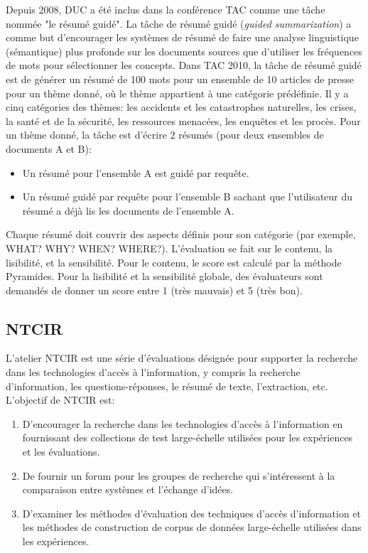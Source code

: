 \documentclass[a4paper,12pt,oneside]{../use/ESIthesis}
\begin{document}
Depuis 2008, DUC a été inclus dans la conférence TAC comme une tâche nommée "le résumé guidé". 
La tâche de résumé guidé (\textit{guided summarization}) a comme but d'encourager les systèmes de résumé de faire une analyse linguistique (sémantique) plus profonde sur les documents sources que d'utiliser les fréquences de mots pour sélectionner les concepts. 
Dans TAC 2010, la tâche de résumé guidé est de générer un résumé de 100 mots pour un ensemble de 10 articles de presse pour un thème donné, où le thème appartient à une catégorie prédéfinie. 
Il y a cinq catégories des thèmes: les accidents et les catastrophes naturelles, les crises, la santé et de la sécurité, les ressources menacées, les enquêtes et les procès.
Pour un thème donné, la tâche est d'écrire 2 résumés (pour deux ensembles de documents A et B):
\begin{itemize}
\item Un résumé pour l'ensemble A est guidé par requête.
\item Un résumé guidé par requête pour l'ensemble B sachant que l'utilisateur du résumé a déjà lis les documents de l'ensemble A.
\end{itemize}
Chaque résumé doit couvrir des aspects définis pour son catégorie (par exemple, WHAT? WHY? WHEN? WHERE?). 
L'évaluation se fait sur le contenu, la lisibilité, et la sensibilité. 
Pour le contenu, le score est calculé par la méthode Pyramides. 
Pour la lisibilité et la sensibilité globale, des évaluateurs sont demandés de donner un score entre 1 (très mauvais) et 5 (très bon).

\subsection{NTCIR}

L'atelier NTCIR est une série d'évaluations désignée pour supporter la recherche dans les technologies d'accès à l'information, y compris la recherche d'information, les questions-réponses, le résumé de texte, l'extraction, etc. 
L'objectif de NTCIR est: 
\begin{enumerate}
\item D'encourager la recherche dans les technologies d'accès à l'information en fournissant des collections de test large-échelle utilisées pour les expériences et les évaluations. 
\item De fournir un forum pour les groupes de recherche qui s'intéressent à la comparaison entre systèmes et l'échange d'idées. 
\item D'examiner les méthodes d'évaluation des techniques d'accès d'information et les méthodes de construction de corpus de données large-échelle utilisées dans les expériences. 
\end{enumerate}
\end{document}
